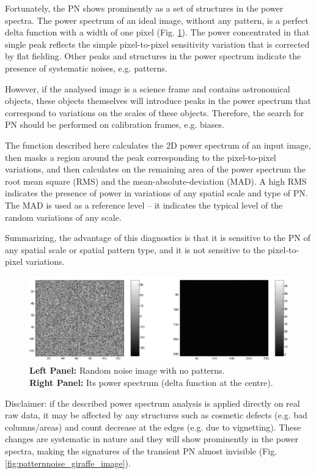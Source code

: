 Fortunately, the PN shows prominently as a set of structures in the power 
spectra. The power spectrum of an ideal image, without any 
pattern, is a perfect delta function with a width of one pixel
(Fig. \ref{fig:patternnoise_test_image}).
The power concentrated in that single peak reflects the simple 
pixel-to-pixel sensitivity variation that is corrected by flat 
fielding. 
Other peaks and structures in the power spectrum indicate the 
presence of systematic noises, e.g. patterns.

However, if the analysed image is a science frame
and contains astronomical objects, these objects themselves will 
introduce peaks in the power spectrum that correspond to variations
on the scales of these objects. Therefore, the search for PN should
be performed on calibration frames, e.g. biases.

The function described here calculates the 2D power spectrum of an
input image, then masks a region around the peak corresponding to
the pixel-to-pixel variations, and then calculates on the remaining 
area of the power spectrum the root mean square (RMS) and the 
mean-absolute-deviation (MAD). A high RMS indicates the presence of
power in variations of any spatial scale and type of PN. The MAD is 
used as a reference level -- it indicates the typical level of the 
random variations of any scale. 

Summarizing, the advantage of this diagnostics is that 
it is sensitive to the PN of any spatial scale or spatial pattern type,
and it is not sensitive to the pixel-to-pixel variations.

\begin{figure}[H]
  \centering \subfigure
  \includegraphics[width=12.0cm]{figures/patternnoise_test-image.png} 
  \caption[]{\footnotesize  {\bf Left Panel:}  Random noise image 
  with no patterns. \\
    {\bf Right Panel:} Its power spectrum (delta function at the centre). }
  \label{fig:patternnoise_test_image}
\end{figure}

Disclaimer: if the described power spectrum 
analysis is applied directly on real raw data, it may be 
affected by any structures such as cosmetic defects (e.g. bad 
columns/areas) and count decrease at the edges (e.g. due to 
vignetting). These changes are systematic in nature and they will 
show prominently in the power spectra, making the signatures 
of the transient PN almost invisible 
(Fig. \ref{fig:patternnoise_giraffe_image}).

